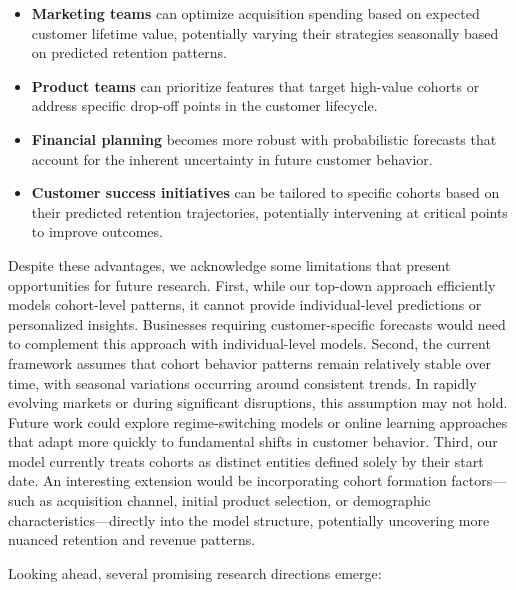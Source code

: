 \documentclass[11pt]{amsart}
\theoremstyle{definition}
\begin{document}
\begin{itemize}
    \item \textbf{Marketing teams} can optimize acquisition spending based on expected customer lifetime value, potentially
          varying their strategies seasonally based on predicted retention patterns.

    \item \textbf{Product teams} can prioritize features that target high-value cohorts or address specific drop-off points
          in the customer lifecycle.

    \item \textbf{Financial planning} becomes more robust with probabilistic forecasts that account for the inherent
          uncertainty in future customer behavior.

    \item \textbf{Customer success initiatives} can be tailored to specific cohorts based on their predicted retention
          trajectories, potentially intervening at critical points to improve outcomes.
\end{itemize}

Despite these advantages, we acknowledge some limitations that present opportunities for future research. First, while our
top-down approach efficiently models cohort-level patterns, it cannot provide individual-level predictions or personalized
insights. Businesses requiring customer-specific forecasts would need to complement this approach with individual-level
models. Second, the current framework assumes that cohort behavior patterns remain relatively stable over time, with seasonal
variations occurring around consistent trends. In rapidly evolving markets or during significant disruptions, this assumption
may not hold. Future work could explore regime-switching models or online learning approaches that adapt more quickly to
fundamental shifts in customer behavior. Third, our model currently treats cohorts as distinct entities defined solely
by their start date. An interesting extension would be incorporating cohort formation factors—such as acquisition channel,
initial product selection, or demographic characteristics—directly into the model structure, potentially uncovering more
nuanced retention and revenue patterns.

Looking ahead, several promising research directions emerge:
\end{document}
